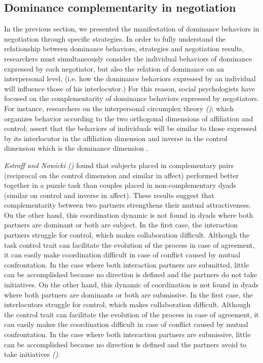 \documentclass[10pt, a4paper, twocolumn]{article} %
\begin{document}
		\subsection{Dominance complementarity in negotiation}
			 In the previous section, we presented the manifestation of dominance behaviors in negotiation through specific strategies.
			 In order to fully understand the relationship between dominance behaviors, strategies and negotiation results, researchers must simultaneously consider the individual behaviors of dominance expressed by each negotiator, but also the relation of dominance on an interpersonal level, (i.e. how the dominance behaviors expressed by an individual will influence those of his interlocutor.)
				For this reason, social psychologists have focused on the complementarity of dominance behaviors expressed by negotiators. For instance, researchers on the interpersonal circumplex theory \emph{(\cites{wiggins1979psychological, kiesler19831982})}; which organizes behavior according to the two orthogonal dimensions of affiliation and control; assert that the behaviors of individuals will be similar to those expressed by its interlocutor in the affiliation dimension and inverse in the control dimension which is the dominance dimension \cite{tiedens2003power}.
				
				\emph{Estroff and Nowicki} \emph{(\cite{estroff1992interpersonal})} found that subjects placed in complementary pairs (reciprocal on the control dimension and similar in affect) performed better together in a puzzle task than couples placed in non-complementary dyads (similar on control and inverse in affect). These results suggest that complementarity between two partners strengthens their mutual attractiveness.
				On the other hand, this coordination dynamic is not found in dyads where both partners are dominant or both are subject. 
				In the first case, the interaction partners struggle for control, which makes collaboration difficult. Although the task control trait can facilitate the evolution of the process in case of agreement, it can easily make coordination difficult in case of conflict caused by mutual confrontation. In the case where both interaction partners are submitted, little can be accomplished because no direction is defined and the partners do not take initiatives.
				On the other hand, this dynamic of coordination  is not found in dyads where both partners are dominants or both are submissive. 
				In the first case, the interlocutors struggle for control, which makes collaboration difficult. Although the control trait can facilitate the evolution of the process in case of agreement, it can easily makes the coordination difficult in case of conflict caused by mutual confrontation. In the case where both interaction partners are submissive, little can be accomplished because no direction is defined and the partners avoid to take initiatives \emph{(\cite{wiltermuth2015benefits})}.
				
\end{document}
